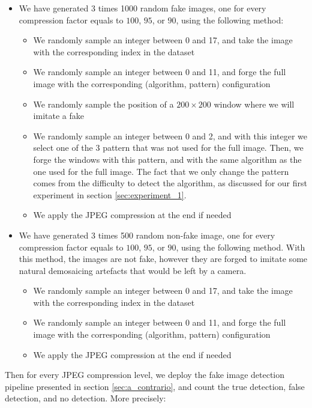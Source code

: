 \documentclass[sigconf, nonacm]{acmart}
\begin{document}
\begin{itemize}
    \item We have generated 3 times 1000 random fake images, one for every compression factor equals to $100$, $95$, or $90$, using the following method:
    \begin{itemize}
        \item We randomly sample an integer between 0 and 17, and take the image with the corresponding index in the dataset
        \item We randomly sample an integer between 0 and 11, and forge the full image with the corresponding (algorithm, pattern) configuration
        \item We randomly sample the position of a $200 \times 200$ window where we will imitate a fake 
        \item We randomly sample an integer between 0 and 2, and with this integer we select one of the 3 pattern that was not used for the full image. Then, we forge the windows with this pattern, and with the same algorithm as the one used for the full image. The fact that we only change the pattern comes from the difficulty to detect the algorithm, as discussed for our first experiment in section \ref{sec:experiment_1}.
        \item We apply the JPEG compression at the end if needed
    \end{itemize}
    \item We have generated 3 times 500 random non-fake image, one for every compression factor equals to $100$, $95$, or $90$, using the following method. With this method, the images are not fake, however they are forged to imitate some natural demosaicing artefacts that would be left by a camera.
    \begin{itemize}
        \item We randomly sample an integer between 0 and 17, and take the image with the corresponding index in the dataset
        \item We randomly sample an integer between 0 and 11, and forge the full image with the corresponding (algorithm, pattern) configuration
        \item We apply the JPEG compression at the end if needed
    \end{itemize}
\end{itemize}

Then for every JPEG compression level, we deploy the fake image detection pipeline presented in section \ref{sec:a_contrario}, and count the true detection, false detection, and no detection. More precisely:
\end{document}
